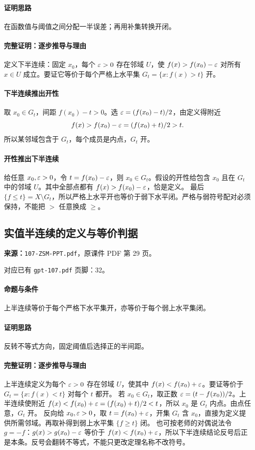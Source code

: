 \paragraph{证明思路}在函数值与阈值之间分配一半误差；再用补集转换开闭。
\paragraph{完整证明：逐步推导与理由}

定义下半连续：固定 $x_0$，每个 $\varepsilon>0$ 存在邻域 $U$，使 $f(x)>f(x_0)-\varepsilon$ 对所有 $x\in U$ 成立。要证它等价于每个严格上水平集 $G_t=\{x:f(x)>t\}$ 开。
\paragraph{下半连续推出开性}取 $x_0\in G_t$，间距 $f(x_0)-t>0$。选 $\varepsilon=(f(x_0)-t)/2$，由定义得附近
\[f(x)>f(x_0)-\varepsilon=(f(x_0)+t)/2>t.\]
所以某邻域包含于 $G_t$，每个成员是内点，$G_t$ 开。
\paragraph{开性推出下半连续}给任意 $x_0,\varepsilon>0$，令 $t=f(x_0)-\varepsilon$，则 $x_0\in G_t$。假设的开性给包含 $x_0$ 且在 $G_t$ 中的邻域 $U$。其中全部点都有 $f(x)>f(x_0)-\varepsilon$，恰是定义。
最后 $\{f\le t\}=X\setminus G_t$，所以严格上水平开也等价于弱下水平闭。严格与弱符号配对必须保持，不能把 $>$ 任意换成 $\ge$。

\clearpage\subsection{实值半连续的定义与等价判据}
\textbf{来源：}\texttt{107-ZSM-PPT.pdf}，原课件 PDF 第 29 页。\par
对应已有 \texttt{gpt-107.pdf} 页脚：32。\par
\paragraph{命题与条件}上半连续等价于每个严格下水平集开，亦等价于每个弱上水平集闭。
\paragraph{证明思路}反转不等式方向，固定阈值后选择正的半间距。
\paragraph{完整证明：逐步推导与理由}

上半连续定义为每个 $\varepsilon>0$ 存在邻域 $U$，使其中 $f(x)<f(x_0)+\varepsilon$。要证等价于 $G_t=\{x:f(x)<t\}$ 对每个 $t$ 都开。
若 $x_0\in G_t$，取正数 $\varepsilon=(t-f(x_0))/2$。上半连续使附近 $f(x)<f(x_0)+\varepsilon=(f(x_0)+t)/2<t$，所以 $x_0$ 是 $G_t$ 内点。由点任意，$G_t$ 开。
反向给 $x_0,\varepsilon>0$，取 $t=f(x_0)+\varepsilon$，开集 $G_t$ 含 $x_0$，直接为定义提供所需邻域。再取补得到弱上水平集 $\{f\ge t\}$ 闭。
也可按老师的对偶说法令 $g=-f$：$g(x)>g(x_0)-\varepsilon$ 等价于 $f(x)<f(x_0)+\varepsilon$，所以下半连续结论反号后正是本条。反号会翻转不等式，不能只更改定理名称不改符号。

